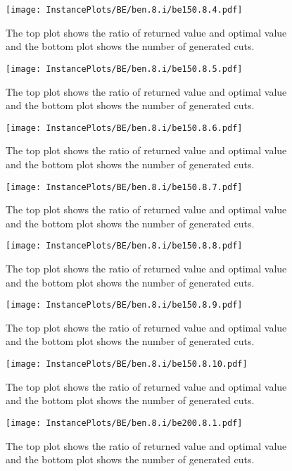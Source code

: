 \documentclass[10pt,a4paper]{article}
\begin{document}
\begin{figure}[H]
\texttt{[image: InstancePlots/BE/ben.8.i/be150.8.4.pdf]}
\caption{The top plot shows the ratio of returned value and optimal value     and the bottom plot shows the number of generated cuts.}
\end{figure}

\begin{figure}[H]
\texttt{[image: InstancePlots/BE/ben.8.i/be150.8.5.pdf]}
\caption{The top plot shows the ratio of returned value and optimal value     and the bottom plot shows the number of generated cuts.}
\end{figure}

\begin{figure}[H]
\texttt{[image: InstancePlots/BE/ben.8.i/be150.8.6.pdf]}
\caption{The top plot shows the ratio of returned value and optimal value     and the bottom plot shows the number of generated cuts.}
\end{figure}

\begin{figure}[H]
\texttt{[image: InstancePlots/BE/ben.8.i/be150.8.7.pdf]}
\caption{The top plot shows the ratio of returned value and optimal value     and the bottom plot shows the number of generated cuts.}
\end{figure}

\begin{figure}[H]
\texttt{[image: InstancePlots/BE/ben.8.i/be150.8.8.pdf]}
\caption{The top plot shows the ratio of returned value and optimal value     and the bottom plot shows the number of generated cuts.}
\end{figure}

\begin{figure}[H]
\texttt{[image: InstancePlots/BE/ben.8.i/be150.8.9.pdf]}
\caption{The top plot shows the ratio of returned value and optimal value     and the bottom plot shows the number of generated cuts.}
\end{figure}

\begin{figure}[H]
\texttt{[image: InstancePlots/BE/ben.8.i/be150.8.10.pdf]}
\caption{The top plot shows the ratio of returned value and optimal value     and the bottom plot shows the number of generated cuts.}
\end{figure}

\begin{figure}[H]
\texttt{[image: InstancePlots/BE/ben.8.i/be200.8.1.pdf]}
\caption{The top plot shows the ratio of returned value and optimal value     and the bottom plot shows the number of generated cuts.}
\end{figure}
\end{document}
